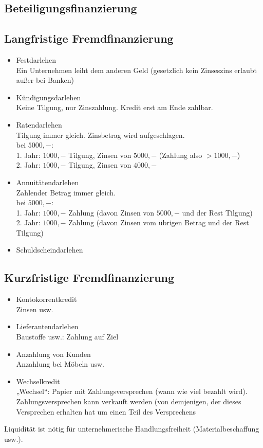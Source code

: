 \subsection{Beteiligungsfinanzierung}
\subsection{Langfristige Fremdfinanzierung}
\begin{itemize}
\item Festdarlehen\\
Ein Unternehmen leiht dem anderen Geld (gesetzlich kein Zinseszins erlaubt außer bei Banken)
\item Kündigungsdarlehen\\
Keine Tilgung, nur Zinszahlung. Kredit erst am Ende zahlbar.
\item Ratendarlehen\\
Tilgung immer gleich. Zinsbetrag wird aufgeschlagen.\\
bei $5000,-$:\\
1. Jahr: $1000,-$ Tilgung, Zinsen von $5000,-$ (Zahlung also $>1000,-$)\\
2. Jahr: $1000,-$ Tilgung, Zinsen von $4000,-$
\item Annuitätendarlehen\\
Zahlender Betrag immer gleich.\\
bei $5000,-$:\\
1. Jahr: $1000,-$ Zahlung (davon Zinsen von $5000,-$ und der Rest Tilgung)\\
2. Jahr: $1000,-$ Zahlung (davon Zinsen vom übrigen Betrag und der Rest Tilgung)
\item Schuldscheindarlehen
\end{itemize}

\subsection{Kurzfristige Fremdfinanzierung}
\begin{itemize}
\item Kontokorrentkredit\\
Zinsen usw.
\item Lieferantendarlehen\\
Baustoffe usw.: Zahlung auf Ziel
\item Anzahlung von Kunden\\
Anzahlung bei Möbeln usw.
\item Wechselkredit\\
„Wechsel“: Papier mit Zahlungsversprechen (wann wie viel bezahlt wird). Zahlungsversprechen kann verkauft werden (von demjenigen, der dieses Versprechen erhalten hat um einen Teil des Versprechens
\end{itemize}
Liquidität ist nötig für unternehmerische Handlungsfreiheit (Materialbeschaffung usw.).


